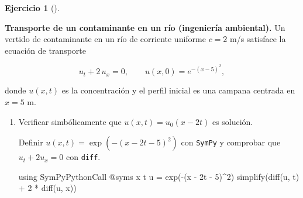 \documentclass[
  spanish,
  a4paper,
]{scrreport}
\newenvironment{Shaded}{\begin{snugshade}}{\end{snugshade}}
\newcommand{\BuiltInTok}[1]{\textcolor[rgb]{0.00,0.23,0.31}{#1}}
\newcommand{\FloatTok}[1]{\textcolor[rgb]{0.68,0.00,0.00}{#1}}
\newcommand{\FunctionTok}[1]{\textcolor[rgb]{0.28,0.35,0.67}{#1}}
\newcommand{\ImportTok}[1]{\textcolor[rgb]{0.00,0.46,0.62}{#1}}
\newcommand{\NormalTok}[1]{\textcolor[rgb]{0.00,0.23,0.31}{#1}}
\newcommand{\OperatorTok}[1]{\textcolor[rgb]{0.37,0.37,0.37}{#1}}
\newcommand{\PreprocessorTok}[1]{\textcolor[rgb]{0.68,0.00,0.00}{#1}}
\theoremstyle{definition}
\newtheorem{exercise}{Ejercicio}[chapter]
\theoremstyle{remark}
\begin{document}
\begin{exercise}[]\protect\hypertarget{exr-transporte-contaminante}{}\label{exr-transporte-contaminante}

\textbf{Transporte de un contaminante en un río (ingeniería ambiental).}
Un vertido de contaminante en un río de corriente uniforme \(c = 2\) m/s
satisface la ecuación de transporte

\[
u_t + 2\,u_x = 0, \qquad u(x, 0) = e^{-(x-5)^2},
\]

donde \(u(x,t)\) es la concentración y el perfil inicial es una campana
centrada en \(x = 5\) m.

\begin{enumerate}
\def\labelenumi{\alph{enumi}.}
\item
  Verificar simbólicamente que \(u(x,t) = u_0(x - 2t)\) es solución.

  \begin{tcolorbox}[enhanced jigsaw, arc=.35mm, bottomrule=.15mm, bottomtitle=1mm, breakable, colback=white, colbacktitle=quarto-callout-note-color!10!white, colframe=quarto-callout-note-color-frame, coltitle=black, left=2mm, leftrule=.75mm, opacityback=0, opacitybacktitle=0.6, rightrule=.15mm, title=\textcolor{quarto-callout-note-color}{\faInfo}\hspace{0.5em}{Ayuda}, titlerule=0mm, toprule=.15mm, toptitle=1mm]

  Definir \(u(x,t) = \exp(-(x - 2t - 5)^2)\) con \texttt{SymPy} y
  comprobar que \(u_t + 2u_x = 0\) con \texttt{diff}.

  \end{tcolorbox}

  \begin{tcolorbox}[enhanced jigsaw, arc=.35mm, bottomrule=.15mm, bottomtitle=1mm, breakable, colback=white, colbacktitle=quarto-callout-tip-color!10!white, colframe=quarto-callout-tip-color-frame, coltitle=black, left=2mm, leftrule=.75mm, opacityback=0, opacitybacktitle=0.6, rightrule=.15mm, title=\textcolor{quarto-callout-tip-color}{\faLightbulb}\hspace{0.5em}{Solución}, titlerule=0mm, toprule=.15mm, toptitle=1mm]

\begin{Shaded}
\begin{Highlighting}[]
\ImportTok{using} \BuiltInTok{SymPyPythonCall}
\PreprocessorTok{@syms}\NormalTok{ x t}
\NormalTok{u }\OperatorTok{=} \FunctionTok{exp}\NormalTok{(}\FunctionTok{{-}}\NormalTok{(x }\OperatorTok{{-}} \FloatTok{2}\NormalTok{t }\OperatorTok{{-}} \FloatTok{5}\NormalTok{)}\OperatorTok{\^{}}\FloatTok{2}\NormalTok{)}
\FunctionTok{simplify}\NormalTok{(}\FunctionTok{diff}\NormalTok{(u, t) }\OperatorTok{+} \FloatTok{2} \OperatorTok{*} \FunctionTok{diff}\NormalTok{(u, x))}
\end{Highlighting}
\end{Shaded}


\end{tcolorbox}
\end{enumerate}
\end{exercise}
\end{document}
